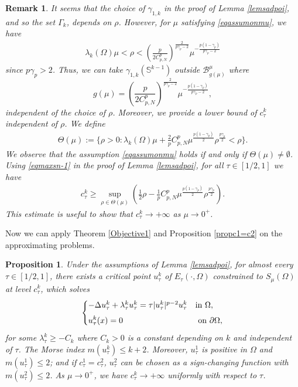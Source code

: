 \documentclass[10pt,a4paper]{article}
\newtheorem{proposition}[theorem]{Proposition}
\newtheorem{remark}[theorem]{Remark}
\theoremstyle{definition} \theoremstyle{remark}
\numberwithin{equation}{section}
\newcommand{\B}{\mathcal{B}}
\newcommand{\s}{\mathbb{S}}
\newcommand{\la}{\lambda}
\newcommand{\Ga}{\Gamma}
\newcommand{\ga}{\gamma}
\begin{document}
\begin{remark} \label{rmklowerbound}
	It seems that the choice of $\ga_{1,k}$ in the proof of Lemma \ref{lemsadpoi}, and so the set $\Ga_k$, depends on $\rho$. However, for $\mu$ satisfying \eqref{eqassumonmu}, we have
	\begin{align*}
		\la_k(\Omega) \mu < \rho < \left(\frac p {2C_{p,N}^p}  \right)^{\frac{2}{p\ga_p-2}}\mu^{-\frac{p(1-\ga_p)}{p\ga_p-2}}
	\end{align*}
    since $p\ga_p > 2$. Thus, we can take $\ga_{1,k}(\s^{k-1})$ outside $\B_{g(\mu)}^\mu$ where
    $$
    g(\mu) = \left(\frac p {2C_{p,N}^p}  \right)^{\frac{2}{p\ga_p-2}}\mu^{-\frac{p(1-\ga_p)}{p\ga_p-2}},
    $$
    independent of the choice of $\rho$. Moreover, we provide a lower bound of $c_\tau^k$ independent of $\rho$. We define
    \begin{align*}
    	\Theta(\mu) := \bigl\{\rho > 0: \la_k(\Omega)\mu + \frac2p C_{p,N}^p \mu^{\frac{p(1-\ga_p)}{2}}\rho ^{\frac{p\ga_p}{2}} < \rho\bigr\}.
    \end{align*}
    We observe that the assumption \eqref{eqassumonmu} holds if and only if $ \Theta(\mu) \neq \emptyset$. Using \eqref{eqmaxsn-1} in the proof of Lemma \ref{lemsadpoi}, for all $\tau \in [1/2,1]$ we have
    \begin{align} \label{eqctooo}
    	c_\tau^k \geq \sup_{\rho \in \Theta(\mu)}\left( \frac12 \rho - \frac1p C_{p,N}^p \mu^{\frac{p(1-\ga_p)}{2}}\rho ^{\frac{p\ga_p}{2}}\right).
    \end{align}
     This estimate is useful to show that $c_\tau^k \to +\infty$ as $\mu \to 0^+$.
\end{remark}

Now we can apply Theorem \ref{Objective1} and Proposition \ref{propc1=c2} on the approximating problems.

\begin{proposition} \label{propaetau}
	Under the assumptions of Lemma \ref{lemsadpoi}, for almost every $\tau \in [1/2,1]$, there exists a critical point $u_\tau^k$ of $E_\tau(\cdot,\Omega)$ constrained to $S_\mu(\Omega)$ at level $c_\tau^k$, which solves
	\begin{align} \label{eqequoftau}
		\begin{cases}
			-\Delta u_\tau^k + \la_\tau^k u_\tau^k = \tau |u_\tau^k|^{p-2}u_\tau^k & \text{in } \Omega, \\[1.5\jot]
			\displaystyle
			u_\tau^k(x) = 0 & \text{ on } \partial \Omega,
		\end{cases}
	\end{align}
	for some $\la_\tau^k \geq -C_k$ where $C_k > 0$ is a constant depending on $k$ and independent of $\tau$. The Morse index $m(u_\tau^k) \leq k+2$. Moreover, $u_\tau^1$ is positive in $\Omega$ and $m(u_\tau^1) \leq 2$; and if $c_\tau^1 = c_\tau^2$, $u_\tau^2$ can be chosen as a sign-changing function with $m(u_\tau^2) \leq 2$. As $\mu \to 0^+$, we have $c_\tau^k \to +\infty$ uniformly with respect to $\tau$.
\end{proposition}
\end{document}
